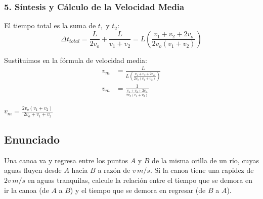 \documentclass[12pt, a4paper]{article}
\begin{document}
\subsubsection*{5. Síntesis y Cálculo de la Velocidad Media}

El tiempo total es la suma de $t_1$ y $t_2$:
\begin{equation}
    \Delta t_{total} = \frac{L}{2v_o} + \frac{L}{v_1 + v_2} = L \left( \frac{v_1 + v_2 + 2v_o}{2v_o(v_1 + v_2)} \right)
\end{equation}

Sustituimos en la fórmula de velocidad media:
\begin{align*}
    v_m &= \frac{L}{L \left( \frac{v_1 + v_2 + 2v_o}{2v_o(v_1 + v_2)} \right)} \\
    v_m &= \frac{1}{\frac{v_1 + v_2 + 2v_o}{2v_o(v_1 + v_2)}}
\end{align*}

\begin{tcolorbox}[colback=blue!5!white, colframe=blue!75!black, title=Respuesta Final]
\centering
\Large $v_m = \frac{2v_o(v_1 + v_2)}{2v_o + v_1 + v_2}$
\end{tcolorbox}

\newpage

\subsection*{Enunciado}

Una canoa va y regresa entre los puntos $A$ y $B$ de la misma orilla de un río, cuyas aguas fluyen desde $A$ hacia $B$ a razón de $v \, \si{m/s}$. Si la canoa tiene una rapidez de $2v \, \si{m/s}$ en aguas tranquilas, calcule la relación entre el tiempo que se demora en ir la canoa (de $A$ a $B$) y el tiempo que se demora en regresar (de $B$ a $A$).

\begin{center}
\end{center}
\end{document}
